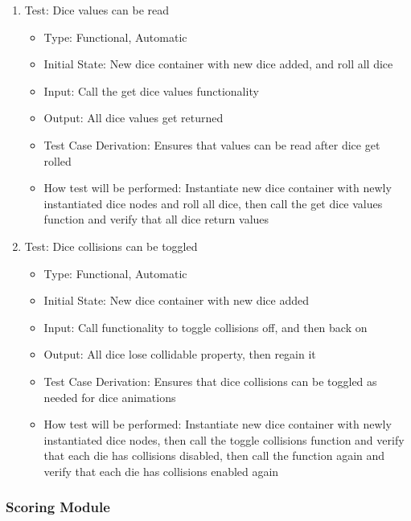 \documentclass[12pt, titlepage]{article}
\begin{document}
\begin{enumerate}
    \item Test: Dice values can be read
    \begin{itemize}
        \item Type: Functional, Automatic
        \item Initial State: New dice container with new dice added, and roll all dice
        \item Input: Call the get dice values functionality
        \item Output: All dice values get returned
        \item Test Case Derivation: Ensures that values can be read after dice get rolled
        \item How test will be performed: Instantiate new dice container with newly instantiated dice nodes and roll all dice, then call the get dice values function and verify that all dice return values
    \end{itemize}

    \item Test: Dice collisions can be toggled
    \begin{itemize}
        \item Type: Functional, Automatic
        \item Initial State: New dice container with new dice added
        \item Input: Call functionality to toggle collisions off, and then back on
        \item Output: All dice lose collidable property, then regain it
        \item Test Case Derivation: Ensures that dice collisions can be toggled as needed for dice animations
        \item How test will be performed: Instantiate new dice container with newly instantiated dice nodes, then call the toggle collisions function and verify that each die has collisions disabled, then call the function again and verify that each die has collisions enabled again
    \end{itemize}

\end{enumerate}

\subsubsection{Scoring Module}
\end{document}

